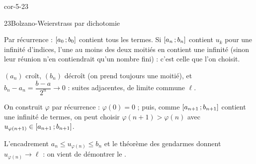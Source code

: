 \begin{blocLivre}{cor-5-23}
\begin{corrige}{23}{Bolzano-Weierstrass par dichotomie}
\begin{questions}
  \item Par récurrence : $\mathopen{[}a_0\,{;}\,b_0\mathclose{]}$ contient tous les termes. Si
    $\mathopen{[}a_n\,{;}\,b_n\mathclose{]}$ contient $u_k$ pour une infinité d'indices, l'une au
    moins des deux moitiés en contient une infinité (sinon leur réunion
    n'en contiendrait qu'un nombre fini) : c'est celle que l'on choisit.
  \item $(a_n)$ croît, $(b_n)$ décroît (on prend toujours une moitié), et
    $b_n-a_n=\dfrac{b-a}{2^{n}}\to0$ : suites adjacentes, de limite commune
    $\ell$.
  \item On construit $\varphi$ par récurrence : $\varphi(0)=0$ ; puis, comme
    $\mathopen{[}a_{n+1}\,{;}\,b_{n+1}\mathclose{]}$ contient une infinité de termes, on peut
    choisir $\varphi(n+1)>\varphi(n)$ avec
    $u_{\varphi(n+1)}\in\mathopen{[}a_{n+1}\,{;}\,b_{n+1}\mathclose{]}$.
  \item L'encadrement $a_n\leq u_{\varphi(n)}\leq b_n$ et le théorème des
    gendarmes donnent $u_{\varphi(n)}\to\ell$ : on vient de démontrer le
    .
\end{questions}
\end{corrige}
\end{blocLivre}


